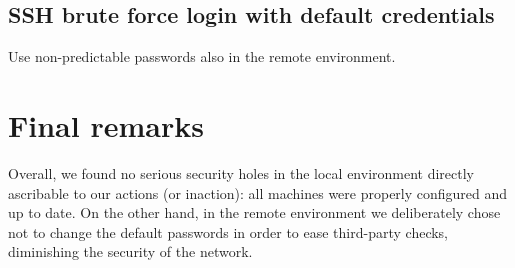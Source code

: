\documentclass[draft]{homework}
\begin{document}
    \subsection{SSH brute force login with default credentials}
    Use non-predictable passwords also in the remote environment.
    
    
    \section{Final remarks}
    Overall, we found no serious security holes in the local environment directly ascribable to our actions (or inaction): all machines were properly configured and up to date.
    On the other hand, in the remote environment we deliberately chose not to change the default passwords in order to ease third-party checks, diminishing the security of the network.
\end{document}
